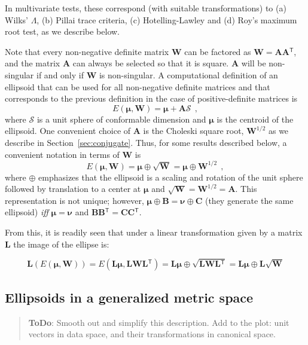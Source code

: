 \documentclass[11pt]{article}%
\newcommand*{\secref}[1]{Section~\ref{#1}}
\newcommand*{\todo}[1]{\marginpar{ToDo:\small{#1}}}
\newcommand{\TODO}[1]{\begin{quotation}\color{blue}\textbf{ToDo}: #1\end{quotation}}
\renewcommand*{\vec}[1]{\ensuremath{\bm{#1}}}
\newcommand{\trans}{\ensuremath{^\mathsf{T}}}
\newcommand*{\mat}[1]{\ensuremath{\bm{#1}}}
\newcommand*{\comma}{\:\: ,}
\begin{document}
In multivariate tests, these correspond (with suitable transformations) to (a) Wilks' $\Lambda$,
(b) Pillai trace criteria, (c) Hotelling-Lawley   and (d) Roy's maximum root test, as we describe
below.

Note that every non-negative definite matrix $\mat{W}$ can be factored as $\mat{W}=\mat{A}\mat{A}\trans$,
and the matrix $\mat{A}$ can always be selected so that it is square. 
$\mat{A}$ will be non-singular if and only if $\mat{W}$ is non-singular.  
A computational
definition of an ellipsoid that can be used for all non-negative definite matrices and that corresponds to the previous definition in the case of positive-definite matrices is
\begin{equation}
E(\vec{\mu},\mat{W}) = \vec{\mu} + \mat{A} \mathcal{S} \comma
\end{equation}
where $\mathcal{S}$ is a unit sphere of conformable dimension and $\vec{\mu}$ is the centroid of the ellipsoid.
One convenient choice of \mat{A} is the Choleski square root, $\mat{W}^{1/2}$ as we describe in \secref{sec:conjugate}.
Thus, for some results described below, a convenient notation in terms of $\mat{W}$ is
\begin{equation}\label{eq:ellipsoidW}
E(\vec{\mu}, \mat{W}) = \vec{\mu} \oplus \sqrt{\mat{W}} = \vec{\mu} \oplus \mat{W}^{1/2} \comma
\end{equation} 
where $\oplus$
emphasizes that the ellipsoid is a scaling and rotation of the unit sphere followed by translation to
a center at \vec{\mu} and $\sqrt{\mat{W}}=\mat{W}^{1/2}=\mat{A}$. This representation is not unique;
however,  $\vec{\mu} \oplus \mat{B} = \vec{\nu} \oplus \mat{C}$ (they generate the same ellipsoid)
\emph{iff} $\vec{\mu} = \vec{\nu}$ and $\mat{B}\mat{B}\trans = \mat{C}\mat{C}\trans$.

From this, it is readily seen that under a linear transformation given by a matrix
$\mat{L}$
the image of the ellipse is:

\begin{equation*}
\mat{L}(E(\vec{\mu} ,\mat{W}))=E(\mat{L}\vec{\mu} ,\mat{L}\mat{W}{\mat{L}}\trans)=\mat{L}\vec{\mu} \oplus \sqrt{\mat{L}\mat{W}{\mat{L}}\trans}=\mat{L}\vec{\mu} \oplus \mat{L}\sqrt{\mat{W}}
\end{equation*}



\subsection{Ellipsoids in a generalized metric space}
\todo{Georges?}
\TODO{
Smooth out and simplify this description.
Add to the plot: unit vectors in data space, and their transformations in canonical space.
}
\end{document}

